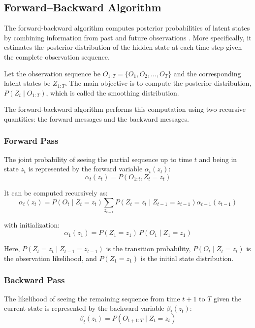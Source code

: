 \subsection{Forward–Backward Algorithm}
\label{sec:forward_backward}
The forward-backward algorithm computes posterior probabilities of latent states by combining information from past and future observations \cite{rabiner1989tutorial}. 
More specifically, it estimates the posterior distribution of the hidden state at each time step given the complete observation sequence.

\par Let the observation sequence be \(O_{1:T} = \{O_1, O_2, \dots, O_T\}\) and the corresponding latent states be \(Z_{1:T}\). 
The main objective is to compute the posterior distribution, $P(Z_t \mid O_{1:T})$, which is called the smoothing distribution.

\par The forward-backward algorithm performs this computation using two recursive quantities: the forward messages and the backward messages.



\subsubsection{Forward Pass}
The joint probability of seeing the partial sequence up to time \(t\) and being in state \(z_t\) is represented by the forward variable \(\alpha_t(z_t)\):
\begin{equation}
\alpha_t(z_t) = P(O_{1:t}, Z_t = z_t)
\label{eq:forward_def}
\end{equation}

It can be computed recursively as:
\begin{equation}
\alpha_t(z_t) =
P(O_t \mid Z_t = z_t)
\sum_{z_{t-1}}
P(Z_t = z_t \mid Z_{t-1} = z_{t-1})
\alpha_{t-1}(z_{t-1})
\label{eq:forward_recursion}
\end{equation}

with initialization:
\[
\alpha_1(z_1) = P(Z_1 = z_1)\, P(O_1 \mid Z_1 = z_1)
\]

Here, $P(Z_t = z_t \mid Z_{t-1} = z_{t-1})$ is the transition probability, $P(O_t \mid Z_t = z_t)$ is the observation likelihood, and $P(Z_1 = z_1)$ is the initial state distribution.




\subsubsection{Backward Pass}
The likelihood of seeing the remaining sequence from time \(t+1\) to \(T\) given the current state 
is represented by the backward variable \(\beta_t(z_t)\):
\begin{equation}
\beta_t(z_t) = P(O_{t+1:T} \mid Z_t = z_t)
\label{eq:backward_def}
\end{equation}

